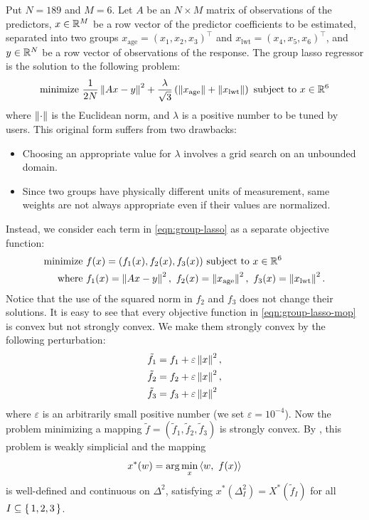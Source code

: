 \documentclass{article}
\begin{document}
Put $N=189$ and $M=6$.
Let $A$ be an $N \times M$ matrix of observations of the predictors, $x \in \mathbb{R}^M$ be a row vector of the predictor coefficients to be estimated, separated into two groups $x_\text{age} = (x_1, x_2, x_3)^\top$ and $x_\text{lwt} = (x_4, x_5, x_6)^\top$, and $y \in \mathbb{R}^N$ be a row vector of observations of the response.
The group lasso regressor is the solution to the following problem:
\begin{equation}\label{eqn:group-lasso}
\text{minimize } \frac{1}{2N} \left\| Ax - y \right\|^2 + \frac{\lambda}{\sqrt{3}} \left( \left\| x_\text{age} \right\| + \left\| x_\text{lwt} \right\| \right) \text{ subject to } x \in \mathbb{R}^6
\end{equation}
where $\left\| \cdot \right\|$ is the Euclidean norm, and $\lambda$ is a positive number to be tuned by users.
This original form suffers from two drawbacks:
\begin{itemize}
    \item Choosing an appropriate value for $\lambda$ involves a grid search on an unbounded domain.
    \item Since two groups have physically different units of measurement, same weights are not always appropriate even if their values are normalized.
\end{itemize}

Instead, we consider each term in \cref{eqn:group-lasso} as a separate objective function:
\begin{equation}\label{eqn:group-lasso-mop}
\begin{split}
    \text{minimize } & f(x)   = (f_1(x), f_2(x), f_3(x)) \text{ subject to } x \in \mathbb{R}^6\\
    \text{where }    & f_1(x) = \left\| Ax - y \right\|^2,\ f_2(x) = \left\| x_\text{age} \right\|^2,\ f_3(x) = \left\| x_\text{lwt} \right\|^2.
\end{split}
\end{equation}
Notice that the use of the squared norm in $f_2$ and $f_3$ does not change their solutions.
It is easy to see that every objective function in \cref{eqn:group-lasso-mop} is convex but not strongly convex.
We make them strongly convex by the following perturbation:
\begin{align*}
    \tilde f_1 &= f_1 + \varepsilon \left\| x \right\|^2,\\
    \tilde f_2 &= f_2 + \varepsilon \left\| x \right\|^2,\\
    \tilde f_3 &= f_3 + \varepsilon \left\| x \right\|^2
\end{align*}
where $\varepsilon$ is an arbitrarily small positive number (we set $\varepsilon=10^{-4}$).
Now the problem minimizing a mapping $\tilde f= (\tilde f_1, \tilde f_2, \tilde f_3)$ is strongly convex.
By \cite[Theorems 1.1 and 3.1]{Hamada2019}, this problem is weakly simplicial and the mapping
\begin{equation}\label{eqn:group-lasso-sop}
    x^*(w) = \arg\min_x \left\langle w,\ f(x) \right\rangle
\end{equation}
is well-defined and continuous on $\Delta^2$, satisfying $x^*(\Delta^2_I) = X^*(\tilde f_I)$ for all $I \subseteq \set{1,2,3}$.
\end{document}

